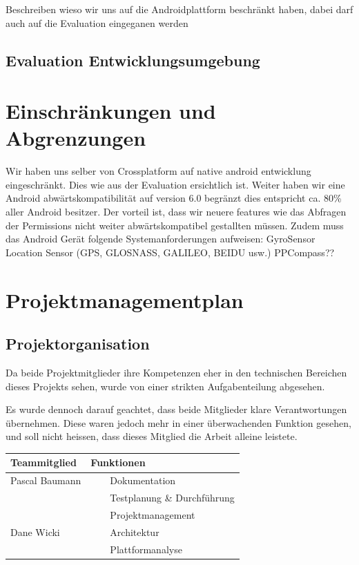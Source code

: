 \documentclass[a4paper]{scrreprt}
\newcommand{\tabitem}{~~\llap{\textbullet}~~}
\begin{document}
Beschreiben wieso wir uns auf die Androidplattform beschränkt haben, dabei darf auch auf die Evaluation eingeganen werden


\subsection{Evaluation Entwicklungsumgebung}

\section{Einschränkungen und Abgrenzungen}
Wir haben uns selber von Crossplatform auf native android entwicklung eingeschränkt. Dies wie aus der Evaluation ersichtlich ist.
Weiter haben wir eine Android abwärtskompatibilität auf version 6.0 begränzt dies entspricht ca. 80\% aller Android besitzer. Der vorteil ist, dass wir neuere features wie das Abfragen der Permissions nicht weiter abwärtskompatibel gestallten müssen.
Zudem muss das Android Gerät folgende Systemanforderungen aufweisen:
	GyroSensor
	Location Sensor (GPS, GLOSNASS, GALILEO, BEIDU usw.)
	PPCompass??


\section{Projektmanagementplan}

\subsection{Projektorganisation}
Da beide Projektmitglieder ihre Kompetenzen eher in den technischen Bereichen dieses Projekts sehen, wurde von einer strikten Aufgabenteilung abgesehen.

Es wurde dennoch darauf geachtet, dass beide Mitglieder klare Verantwortungen übernehmen. Diese waren jedoch mehr in einer überwachenden Funktion gesehen, und soll nicht heissen, dass dieses Mitglied die Arbeit alleine leistete.

\vspace{1em}

\begin{tabularx}{\textwidth}{|X|X|}
	\hline
	\textbf{Teammitglied} & \textbf{Funktionen} \\
	\hline
	Pascal Baumann & \tabitem Dokumentation \\
	& \tabitem Testplanung \& Durchführung \\
	& \tabitem Projektmanagement \\
	\hline
	Dane Wicki & \tabitem Architektur \\
	& \tabitem Plattformanalyse \\
	\hline
\end{tabularx}
\end{document}
